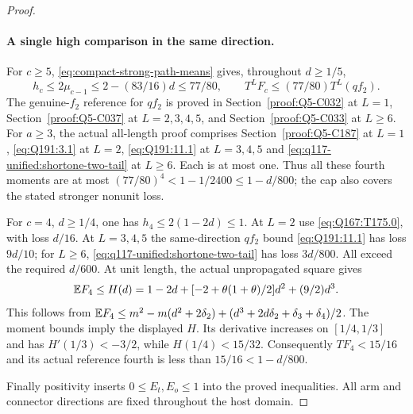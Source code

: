 \begin{proof}
\paragraph{A single high comparison in the same direction.}
For $c\ge5$, \eqref{eq:compact-strong-path-means} gives, throughout
$d\ge1/5$,
\[
 h_c\le2\mu_{c-1}\le2-(83/16)d\le77/80,
 \qquad T^LF_c\le(77/80)T^L(qf_2).
\]
The genuine-$f_2$ reference for $qf_2$ is proved in
Section~\ref{proof:Q5-C032} at $L=1$,
Section~\ref{proof:Q5-C037} at $L=2,3,4,5$, and
Section~\ref{proof:Q5-C033} at $L\ge6$.
For $a\ge3$, the actual all-length proof comprises
Section~\ref{proof:Q5-C187} at $L=1$,
\eqref{eq:Q191:3.1} at $L=2$,
\eqref{eq:Q191:11.1} at $L=3,4,5$ and
\eqref{eq:q117-unified:shortone-two-tail} at $L\ge6$.
Each is at most one. Thus all these fourth moments are at most
$(77/80)^4<1-1/2400\le1-d/800$; the cap also covers the stated
stronger nonunit loss.

For $c=4$, $d\ge1/4$, one has $h_4\le2(1-2d)\le1$.
At $L=2$ use \eqref{eq:Q167:T175.0}, with loss $d/16$.
At $L=3,4,5$ the same-direction $qf_2$ bound
\eqref{eq:Q191:11.1} has loss $9d/10$; for $L\ge6$,
\eqref{eq:q117-unified:shortone-two-tail} has loss $3d/800$.
All exceed the required $d/600$.
At unit length, the actual unpropagated square gives
\[
 \mathbb E F_4\le H(d)=1-2d+[-2+\theta(1+\theta)/2]d^2+(9/2)d^3.
\]
This follows from
$\mathbb E F_4\le m^2-m(d^2+2\delta_2)
+(d^3+2d\delta_2+\delta_3+\delta_4)/2$.
The moment bounds imply the displayed $H$. Its derivative increases
on $[1/4,1/3]$ and has $H'(1/3)<-3/2$, while $H(1/4)<15/32$.
Consequently $TF_4<15/16$ and its actual reference fourth is less
than $15/16<1-d/800$.

Finally positivity inserts $0\le E_t,E_o\le1$ into the proved
inequalities.
All arm and connector directions are fixed throughout the host domain.
\end{proof}
